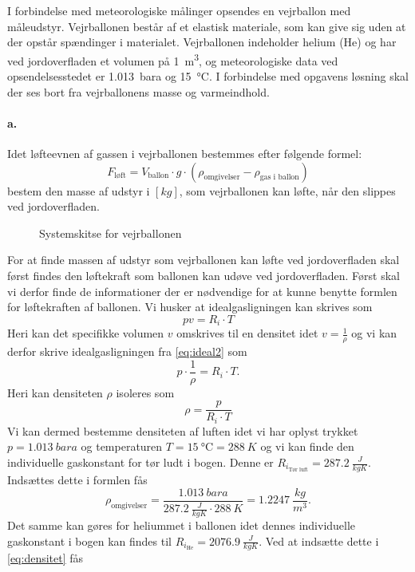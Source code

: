 \documentclass[a4paper]{article}
\begin{document}
I forbindelse med meteorologiske målinger opsendes en vejrballon med måleudstyr. Vejrballonen består af et elastisk materiale, som kan give sig uden at der opstår spændinger i materialet. Vejrballonen indeholder helium (He) og har ved jordoverfladen et volumen på \qty{1}{m^3}, og meteorologiske data ved opsendelsesstedet er \qty{1,013}{bara} og \qty{15}{\celsius}. I forbindelse med opgavens løsning skal der ses bort fra vejrballonens masse og varmeindhold.

\paragraph{a.} Idet løfteevnen af gassen i vejrballonen bestemmes efter følgende formel:
\[ 
F_{\text{løft}} = V_{\text{ballon}} \cdot g \cdot \left( \rho_{\text{omgivelser}} - \rho_{\text{gas i ballon}} \right)
\]
bestem den masse af udstyr i $[\unit{kg}]$, som vejrballonen kan løfte, når den slippes ved jordoverfladen.
\bigbreak
\begin{figure}[ht]
    \centering
    \caption{Systemskitse for vejrballonen}
    \label{fig:a2_2_1}
\end{figure}
For at finde massen af udstyr som vejrballonen kan løfte ved jordoverfladen skal først findes den løftekraft som ballonen kan udøve ved jordoverfladen. Først skal vi derfor finde de informationer der er nødvendige for at kunne benytte formlen for løftekraften af ballonen. Vi husker at idealgasligningen kan skrives som
\begin{equation} \label{eq:ideal2}
  p v = R_i \cdot T
\end{equation}
Heri kan det specifikke volumen $v$ omskrives til en densitet idet $v = \frac{1}{\rho}$ og vi kan derfor skrive idealgasligningen fra \autoref{eq:ideal2} som
\[ 
  p \cdot \frac{1}{\rho} = R_i \cdot T
.\]
Heri kan densiteten $\rho$ isoleres som
\begin{equation} \label{eq:densitet}
  \rho = \frac{p}{R_i \cdot T}
\end{equation}
Vi kan dermed bestemme densiteten af luften idet vi har oplyst trykket $p = \qty{1,013}{bara}$ og temperaturen $T = \qty{15}{\celsius} = \qty{288}{K}$ og vi kan finde den individuelle gaskonstant for tør ludt i bogen. Denne er $R_{i_{\text{Tør luft}}} = \qty{287,2}{\frac{J}{kgK}}$. Indsættes dette i formlen fås
\[ 
\rho_{\text{omgivelser}} = \frac{\qty{1,013}{bara}}{\qty{287,2}{\frac{J}{kgK}} \cdot \qty{288}{K}} = \qty{1,2247}{\frac{kg}{m^3}} 
.\]
Det samme kan gøres for heliummet i ballonen idet dennes individuelle gaskonstant i bogen kan findes til $R_{i_{\text{He}}} = \qty{2076,9}{\frac{J}{kgK}}$. Ved at indsætte dette i \autoref{eq:densitet} fås
\end{document}

